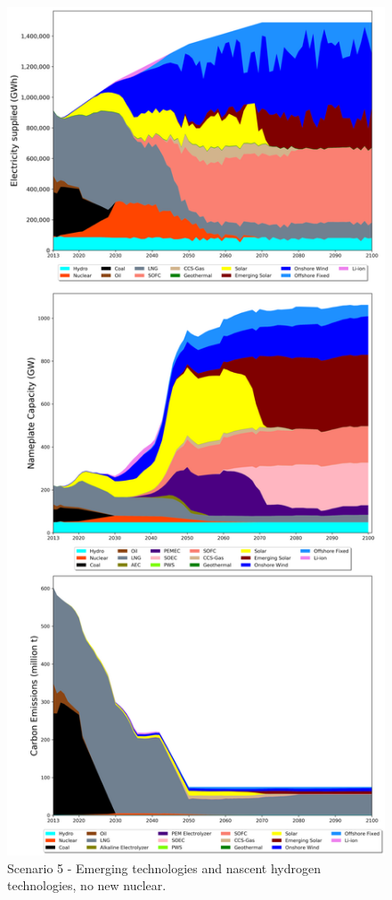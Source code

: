 \begin{figure}[H] 
\centering
\vspace*{-3cm}
\includegraphics[scale=0.41]{figures/lowtrltech_nonuc}
\caption{Scenario 5 - Emerging technologies and nascent hydrogen technologies, no new nuclear.}
\label{scen5}
\end{figure}

